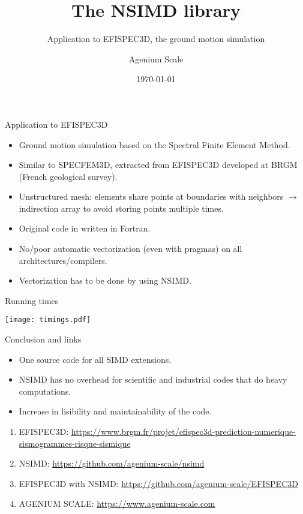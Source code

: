 \documentclass[shrink, compress, mathserif, 10pt, xcolor=dvipsnames,
               aspectratio=169]{beamer}
\title{The NSIMD library}
\subtitle{Application to EFISPEC3D, the ground motion simulation}
\date{\today}
\author{Agenium Scale}
\begin{document}
\begin{frame}[plain]
  \maketitle
\end{frame}



\begin{frame}{Application to EFISPEC3D}
  \begin{itemize}
    \item Ground motion simulation based on the Spectral Finite Element Method.
    \vspace{1em}
    \item Similar to SPECFEM3D, extracted from EFISPEC3D developed at BRGM
          (French geological survey).
    \vspace{1em}
    \item Unstructured mesh: elements share points at boundaries with neighbors
          $\longrightarrow$ indirection array to avoid storing points multiple
          times.
    \vspace{1em}
    \item Original code in written in Fortran.
    \vspace{1em}
    \item No/poor automatic vectorization (even with pragmas) on all
          architectures/compilers.
    \vspace{1em}
    \item Vectorization has to be done by using NSIMD.
  \end{itemize}
\end{frame}

\begin{frame}{Running times}
  \begin{center}
    \texttt{[image: timings.pdf]}
  \end{center}
\end{frame}

\begin{frame}{Conclusion and links}
  \begin{itemize}
    \item
      One source code for all SIMD extensions.
    \item
      NSIMD has no overhead for scientific and industrial codes that do
      heavy computations.
    \item
      Increase in lisibility and maintainability of the code.
  \end{itemize}

  \vspace{2em}
  \begin{enumerate}
    \item EFISPEC3D: \url{https://www.brgm.fr/projet/efispec3d-prediction-numerique-sismogrammes-risque-sismique}
    \item NSIMD: \url{https://github.com/agenium-scale/nsimd}
    \item EFISPEC3D with NSIMD: \url{https://github.com/agenium-scale/EFISPEC3D}
    \item AGENIUM SCALE: \url{https://www.agenium-scale.com}
  \end{enumerate}
\end{frame}
\end{document}
